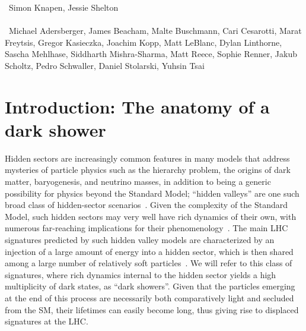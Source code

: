 ~Simon Knapen, Jessie Shelton \\
\text{ \; }\\
~Michael Adersberger, James Beacham, Malte Buschmann, Cari Cesarotti, Marat Freytsis, Gregor Kasieczka, Joachim Kopp, Matt LeBlanc, Dylan Linthorne,  Sascha Mehlhase, Siddharth Mishra-Sharma, Matt Reece, Sophie Renner, Jakub Scholtz, Pedro Schwaller, Daniel Stolarski, Yuhsin Tsai 
\text{ \; }\\

\section{Introduction: The anatomy of a dark shower}
\label{sec:darkshowerintro}

Hidden sectors are increasingly common features in many models that address mysteries of particle physics such as the hierarchy problem, the origins of dark matter, baryogenesis, and neutrino masses, in addition to being a generic possibility for physics beyond the Standard Model; ``hidden valleys'' are one such broad class of hidden-sector scenarios~\cite{Strassler:2006im,Han:2007ae}. Given the complexity of the Standard Model, such hidden sectors may very well have rich dynamics of their own, with numerous far-reaching implications for their phenomenology~\cite{Strassler:2006ri,Strassler:2006qa,Strassler:2008bv,Strassler:2008fv,Juknevich:2009ji}. The main LHC signatures predicted by such hidden valley models are characterized by an injection of a large amount of energy into a hidden sector, which is then shared among a large number of relatively soft particles~\cite{Strassler:2008bv}. We will refer to this class of signatures, where rich dynamics internal to the hidden sector yields a high multiplicity of dark states, as ``dark showers''. Given that the particles emerging at the end of this process are necessarily both comparatively light and secluded from the SM, their lifetimes can easily become long, thus giving rise to displaced signatures at the LHC.

